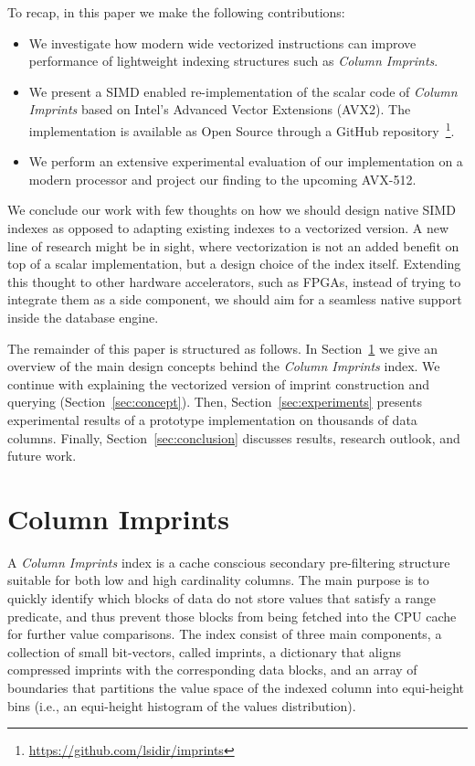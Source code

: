 \documentclass[sigconf]{acmart}
\begin{document}
To recap, in this paper we make the following contributions:
\begin{itemize}
    \item We investigate how modern wide vectorized instructions can improve performance of
    lightweight indexing structures such as {\em Column Imprints}.
    \item We present a SIMD enabled re-implementation of the scalar code of {\em Column Imprints} based
    on Intel's Advanced Vector Extensions (AVX2). The implementation is available as Open Source 
    through a GitHub repository~\footnote{\label{repo}\url{https://github.com/lsidir/imprints}}.
    \item We perform an extensive experimental evaluation of our implementation on a modern processor 
    and project our finding to the upcoming AVX-512.
\end{itemize}

We conclude our work with few thoughts on how we should design native SIMD indexes as opposed to
adapting existing indexes to a vectorized version. A new line of research might be in sight, where
vectorization is not an added benefit on top of a scalar implementation, but a design choice of the
index itself. Extending this thought to other hardware accelerators, such as FPGAs, instead of trying
to integrate them as a side component, we should aim for a seamless native support inside the
database engine.

The remainder of this paper is structured as follows. In Section~\ref{sec:imprints} we give an overview 
of the main design concepts behind the {\em Column Imprints} index. We continue with explaining the 
vectorized version of imprint construction and querying (Section~\ref{sec:concept}). Then, 
Section~\ref{sec:experiments} presents experimental results of a prototype implementation on thousands 
of data columns. Finally, Section~\ref{sec:conclusion} discusses results, research outlook, and future 
work.

\section{Column Imprints}\label{sec:imprints}

A {\em Column Imprints} index is a cache conscious secondary pre-filtering structure
suitable for both low and high cardinality columns. The main purpose is to quickly
identify which blocks of data do not store values that satisfy a range predicate,
and thus prevent those blocks from being fetched into the CPU cache for further
value comparisons. The index consist of three main components, a collection of small
bit-vectors, called imprints, a dictionary that aligns compressed imprints with
the corresponding data blocks, and an array of boundaries that partitions the
value space of the indexed column into equi-height bins (i.e., an equi-height
histogram of the values distribution). 
\end{document}
